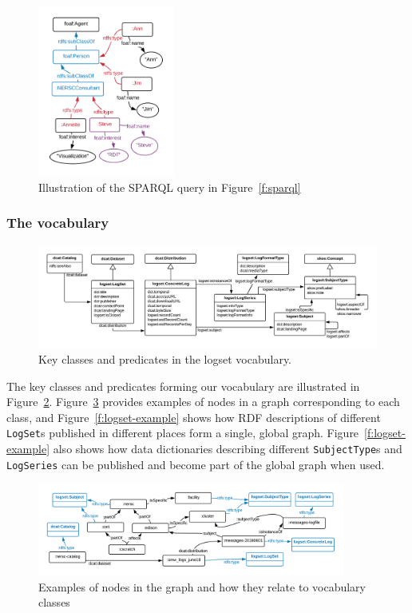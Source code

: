 \begin{figure}
\includegraphics[width=0.4\textwidth]{sparql.png}
\caption{Illustration of the SPARQL query in Figure~\ref{f:sparql} }
\label{f:sparql-diagram}
\end{figure}

\subsubsection{The vocabulary}

\begin{figure}
\includegraphics[width=1.0\textwidth]{logset-key-classes.png}
\caption{Key classes and predicates in the logset vocabulary. }
\label{f:logset-classes}
\end{figure}

The key classes and predicates forming our vocabulary are illustrated in 
Figure~\ref{f:logset-classes}. Figure~\ref{f:logset-classes-nodes} provides 
examples of nodes in a graph corresponding to each class, and 
Figure~\ref{f:logset-example} shows how RDF descriptions of different
\texttt{LogSet}s published in different places form a single, global graph.
Figure~\ref{f:logset-example} also shows how data dictionaries 
describing different \texttt{SubjectType}s and \texttt{LogSeries} can be 
published and become part of the global graph when used.


\begin{figure}
\includegraphics[width=0.9\textwidth]{logset-classes-nodes.png}
\caption{Examples of nodes in the graph and how they relate to
vocabulary classes}
\label{f:logset-classes-nodes}
\end{figure}

